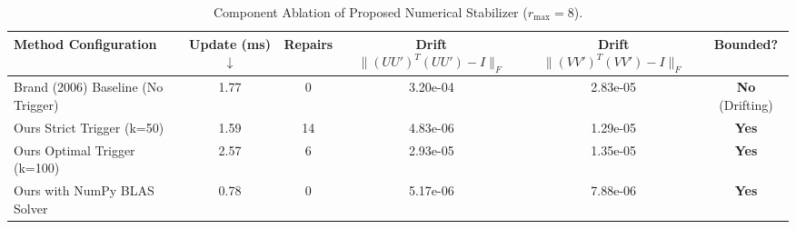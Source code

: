 \begin{table}[h]
\centering
\caption{Component Ablation of Proposed Numerical Stabilizer ($r_{\max}=8$).}
\label{tab:component_ablation}
\begin{tabular}{lccccc}
\toprule
Method Configuration & Update (ms) $\downarrow$ & Repairs & Drift $\|(U U')^T (U U') - I\|_F$ & Drift $\|(V V')^T (V V') - I\|_F$ & Bounded? \\
\midrule
Brand (2006) Baseline (No Trigger)   & 1.77 & 0 & 3.20e-04 & 2.83e-05 & \textbf{No} (Drifting) \\
Ours Strict Trigger (k=50)           & 1.59 & 14 & 4.83e-06 & 1.29e-05 & \textbf{Yes} \\
Ours Optimal Trigger (k=100)         & 2.57 & 6 & 2.93e-05 & 1.35e-05 & \textbf{Yes} \\
Ours with NumPy BLAS Solver          & 0.78 & 0 & 5.17e-06 & 7.88e-06 & \textbf{Yes} \\
\bottomrule
\end{tabular}
\end{table}
